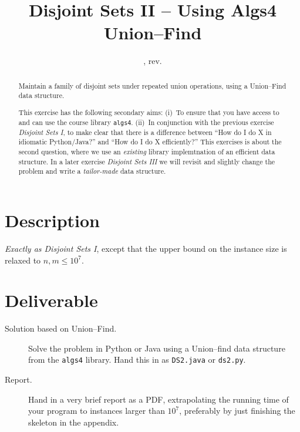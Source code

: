 \documentclass{tufte-handout}
\title{Disjoint Sets II -- Using Algs4 Union--Find}
\author{}
\date{\GITAuthorDate, rev. \GITAbrHash}
\begin{document}
\maketitle

\begin{abstract}
  Maintain a family of disjoint sets under repeated union operations, using a Union--Find data structure.

  This exercise has the following secondary aims:
  (i)~To ensure that you have access to and can use the course library \texttt{algs4}.
  (ii)~In conjunction with the previous exercise \emph{Disjoint Sets I}, to make clear that there is a difference between ``How do I do X in idiomatic Python/Java?'' and ``How do I do X efficiently?''
  This exercises is about the second question, where we use an \emph{existing} library implemtnation of an efficient data structure.
  In a later exercise \emph{Disjoint Sets III} we will revisit and slightly change the problem and write a \emph{tailor-made} data structure.
\end{abstract}

\section{Description}

\emph{Exactly as Disjoint Sets I}, except that the upper bound on the instance size is relaxed to $n,m\leq 10^7$.

\section{Deliverable}

\begin{description}
  \item[Solution based on Union--Find.]
    Solve the problem in Python or Java using a Union--find data structure from the \texttt{algs4} library.
    Hand this in as \texttt{DS2.java} or \texttt{ds2.py}.
  \item[Report.]
    Hand in a very brief report as a PDF, extrapolating the running time of your program to instances larger than $10^7$, preferably by just finishing the skeleton in the appendix. 
\end{description}
\end{document}
